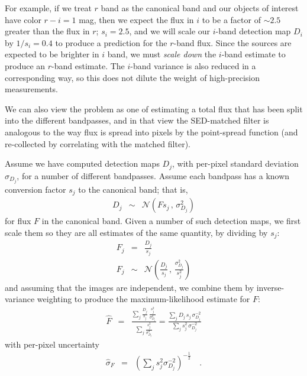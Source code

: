 \documentclass[11pt,letterpaper,linenumbers]{aastex7}
\newcommand{\drawnfrom}{\sim}
\newcommand{\gaussianN}{\mathcal{N}}
\newcommand{\gaussx}[2]{\gaussianN\!\left(#1 \, , \, #2\right)}
\newcommand{\sigdj}{\sigma_{D_j}}
\newcommand{\changed}[1]{#1}
\begin{document}
\changed{
For example, if we treat $r$ band as the canonical band and our
objects of interest have color $r-i = 1$ mag, then we expect the flux in
$i$ to be a factor of $\sim2.5$ greater than the flux in $r$; $s_i = 2.5$,
and we will scale our $i$-band detection map $D_i$ by $1/s_i = 0.4$ to
produce a prediction for the $r$-band flux.  Since the sources are
expected to be brighter in $i$ band, we must \emph{scale down} the
$i$-band estimate to produce an $r$-band estimate.  The $i$-band
variance is also reduced in a corresponding way, so this does not
dilute the weight of high-precision measurements.
}

We can also view the problem as one of
estimating a total flux that has been split into the different
bandpasses, and in that view the SED-matched filter is analogous to
the way flux is spread into pixels by the point-spread function (and
re-collected by correlating with the matched filter).


Assume we have computed detection maps $D_j$, with per-pixel standard deviation
$\sigdj$, for a number of different bandpasses.  Assume each
bandpass has a known conversion factor $s_j$ to the canonical band;
that is,
\begin{eqnarray}
  D_j & \drawnfrom & \gaussx{F s_j}{\sigdj^2}
\end{eqnarray}
for flux $F$ in the canonical band.
%
Given a number of such detection maps, we first scale them so they are all estimates of the
same quantity, by dividing by $s_j$:
\begin{eqnarray}
  F_j & = & \frac{D_j}{s_j} \\
  F_j & \drawnfrom & \gaussx{\frac{D_j}{s_j}}{\frac{\sigdj^2}{s_j^2}}
\end{eqnarray}
and assuming that the images  are independent, we combine them by inverse-variance weighting
to produce the maximum-likelihood estimate for $F$:
\begin{eqnarray}
  \hat{F} &=& 
  \frac{\displaystyle\sum_j \frac{D_j}{s_j} \, \frac{s_j^2}{\sigdj^2}}%
       {\displaystyle\sum_j \frac{s_j^2}{\sigdj^2}}
       = 
       \frac{\displaystyle\sum_j D_j \, s_j \, \sigdj^{-2}}%
            {\displaystyle\sum_j s_j^2 \, \sigdj^{-2}}
\end{eqnarray}
with per-pixel uncertainty
\begin{eqnarray}
  \hat{\sigma}_F &=& \left( \sum_j s_j^2 \sigdj^{-2} \right)^{-\frac{1}{2}}
  \quad .
\end{eqnarray}
\end{document}
